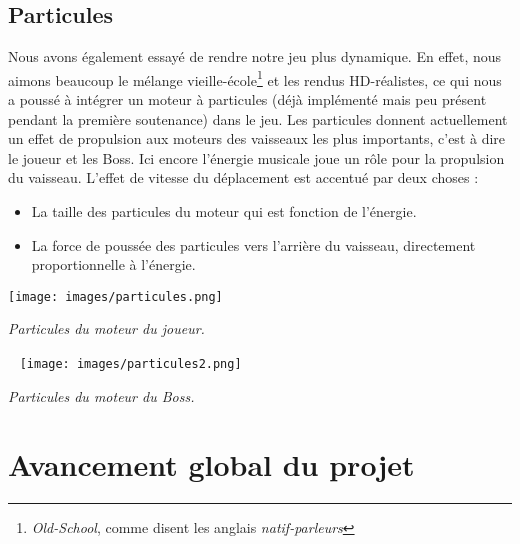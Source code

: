 \documentclass[12pt,a4paper]{article}
\begin{document}
		\subsection{Particules}
		Nous avons également essayé de rendre notre jeu plus dynamique. En effet, nous aimons beaucoup le mélange vieille-école\footnote{\emph{Old-School}, comme disent les anglais \emph{natif-parleurs}} et les rendus HD-réalistes, ce qui nous a poussé à intégrer un moteur à particules (déjà implémenté mais peu présent pendant la première soutenance) dans le jeu. Les particules donnent actuellement un effet de propulsion aux moteurs des vaisseaux les plus importants, c'est à dire le joueur et les Boss. Ici encore l'énergie musicale joue un rôle pour la propulsion du vaisseau. L'effet de vitesse du déplacement est accentué par deux choses :
		\begin{itemize}
		\item La taille des particules du moteur qui est fonction de l'énergie.
		\item La force de poussée des particules vers l'arrière du vaisseau, directement proportionnelle à l'énergie.
		\end{itemize}
	\newpage	
			\begin{center}
		\vspace{1cm}
		\texttt{[image: images/particules.png]}
		\par \emph{Particules du moteur du joueur.}
		\vspace{1cm}
		\par~
		\texttt{[image: images/particules2.png]}
		\par \emph{Particules du moteur du Boss.}
		\vspace{1cm}
		\end{center}
	\newpage
	\section{Avancement global du projet}
\end{document}
